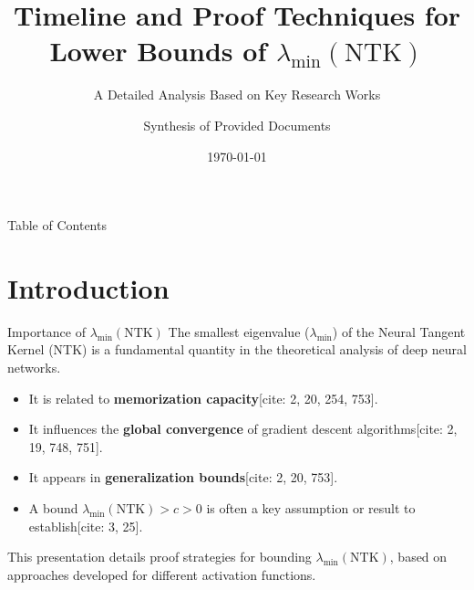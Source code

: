 \documentclass{beamer}
\title{Timeline and Proof Techniques for Lower Bounds of $\lambda_{\min}(\text{NTK})$}
\subtitle{A Detailed Analysis Based on Key Research Works}
\author{Synthesis of Provided Documents}
\date{\today}
\theoremstyle{definition}
\theoremstyle{remark}
\newcommand{\lambdaMin}{\lambda_{\min}}
\begin{document}
\begin{frame}
  \titlepage
\end{frame}

\begin{frame}{Table of Contents}
  \tableofcontents
\end{frame}

\section{Introduction}
\begin{frame}{Importance of $\lambda_{\min}(\text{NTK})$}
  \justify
  The smallest eigenvalue ($\lambdaMin$) of the Neural Tangent Kernel (NTK) is a fundamental quantity in the theoretical analysis of deep neural networks.
  \begin{itemize}
    \item It is related to \textbf{memorization capacity}[cite: 2, 20, 254, 753].
    \item It influences the \textbf{global convergence} of gradient descent algorithms[cite: 2, 19, 748, 751].
    \item It appears in \textbf{generalization bounds}[cite: 2, 20, 753].
    \item A bound $\lambdaMin(\text{NTK}) > c > 0$ is often a key assumption or result to establish[cite: 3, 25].
  \end{itemize}
  This presentation details proof strategies for bounding $\lambdaMin(\text{NTK})$, based on approaches developed for different activation functions.
\end{frame}

\end{document}
